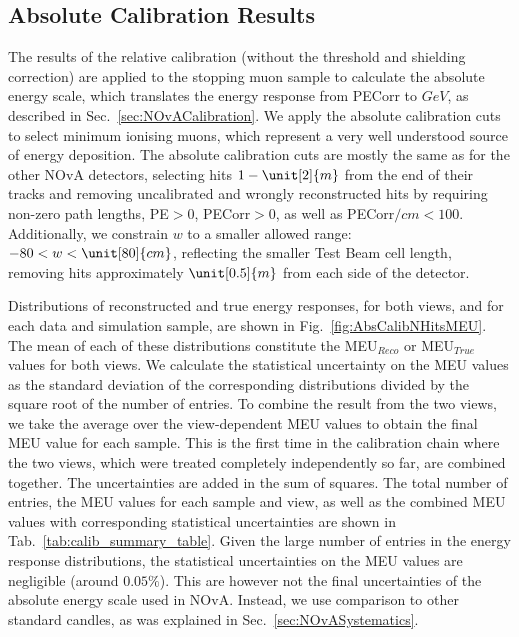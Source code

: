 \FloatBarrier
\subsection{Absolute Calibration Results}\label{sec:TBAbsoluteCalib}
The results of the relative calibration (without the threshold and shielding correction) are applied to the stopping muon sample to calculate the absolute energy scale,  which translates the energy response from \gls{PECorr} to $\unit{GeV}$, as described in Sec.~\ref{sec:NOvACalibration}. We apply the absolute calibration cuts to select minimum ionising muons, which represent a very well understood source of energy deposition. The absolute calibration cuts are mostly the same as for the other \gls{NOvA} detectors, selecting hits $1-\unit[2]{m}$ from the end of their tracks and removing uncalibrated and wrongly reconstructed hits by requiring non-zero path lengths, \gls{PE}$>0$, \gls{PECorr}$>0$, as well as \gls{PECorr}$\unit{/cm}<100$. Additionally, we constrain $w$ to a smaller allowed range: $-80<w<\unit[80]{cm}$, reflecting the smaller Test Beam cell length, removing hits approximately $\unit[0.5]{m}$ from each side of the detector.

Distributions of reconstructed and true energy responses, for both views, and for each data and simulation sample, are shown in Fig.~\ref{fig:AbsCalibNHitsMEU}. The mean of each of these distributions constitute the \gls{MEU}$_{Reco}$ or \gls{MEU}$_{True}$ values for both views. We calculate the statistical uncertainty on the \gls{MEU} values as the standard deviation of the corresponding distributions divided by the square root of the number of entries. To combine the result from the two views, we take the average over the view-dependent \gls{MEU} values to obtain the final \gls{MEU} value for each sample. This is the first time in the calibration chain where the two views, which were treated completely independently so far, are combined together. The uncertainties are added in the sum of squares. The total number of entries, the \gls{MEU} values for each sample and view, as well as the combined \gls{MEU} values with corresponding statistical uncertainties are shown in Tab.~\ref{tab:calib_summary_table}. Given the large number of entries in the energy response distributions, the statistical uncertainties on the \gls{MEU} values are negligible (around $0.05\%$). This are however not the final uncertainties of the absolute energy scale used in \gls{NOvA}. Instead, we use comparison to other standard candles, as was explained in Sec.~\ref{sec:NOvASystematics}.

